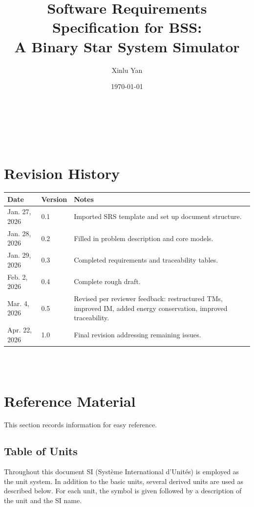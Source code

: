 \documentclass[12pt]{article}
\begin{document}
\title{Software Requirements Specification for BSS:\\ A Binary Star System Simulator} 
\author{Xinlu Yan}
\date{\today}
	
\maketitle

~\newpage


\tableofcontents

~\newpage

\section*{Revision History}

\begin{tabularx}{\textwidth}{p{3cm}p{2cm}X}
\toprule {\bf Date} & {\bf Version} & {\bf Notes}\\
\midrule
Jan. 27, 2026 & 0.1 & Imported SRS template and set up document structure.\\
Jan. 28, 2026 & 0.2 & Filled in problem description and core models.\\
Jan. 29, 2026 & 0.3 & Completed requirements and traceability tables.\\
Feb. 2, 2026 & 0.4 & Complete rough draft.\\
Mar. 4, 2026 & 0.5 & Revised per reviewer feedback: restructured TMs, improved IM, added energy conservation, improved traceability.\\
Apr. 22, 2026 & 1.0 & Final revision addressing remaining issues.\\
\bottomrule
\end{tabularx}

~\\

~\newpage

\section{Reference Material}

This section records information for easy reference.

\subsection{Table of Units}

Throughout this document SI (Syst\`{e}me International d'Unit\'{e}s) is employed
as the unit system.  In addition to the basic units, several derived units are
used as described below.  For each unit, the symbol is given followed by a
description of the unit and the SI name. ~\newline
\end{document}

